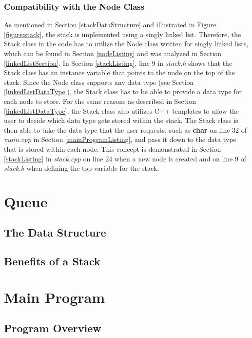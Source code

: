 \documentclass[letterpaper, 10pt,DIV=13]{scrartcl}
\numberwithin{equation}{section} %
\numberwithin{figure}{section} %
\numberwithin{table}{section} %
\begin{document}
\subsubsection{Compatibility with the Node Class}
As mentioned in Section \ref{stackDataStructure} and illustrated in Figure \ref{figure:stack}, the stack is implemented using a singly linked list. Therefore, the Stack
class in the code has to utilize the Node class written for singly linked lists, which can be found in Section \ref{nodeListing} and was analyzed in Section \ref{linkedListSection}.
In Section \ref{stackListing}, line 9 in \textit{stack.h} shows that the Stack class has an instance variable that points to the node on the top of the stack. Since the Node
class supports any data type (see Section \ref{linkedListDataType}), the Stack class has to be able to provide a data type for each node to store. For the same reasons as
described in Section \ref{linkedListDataType}, the Stack class also utilizes C++ templates to allow the user to decide which data type gets stored within the stack.
The Stack class is then able to take the data type that the user requests, such as \textbf{char} on line 32 of \textit{main.cpp} in Section \ref{mainProgramListing},
and pass it down to the data type that is stored within each node. This concept is demonstrated in Section \ref{stackListing} in \textit{stack.cpp} on 
line 24 when a new node is created and on line 9 of \textit{stack.h} when defining the top variable for the stack.

\section{Queue}
\subsection{The Data Structure}

\subsection{Benefits of a Stack}

\section{Main Program}
\subsection{Program Overview}
\end{document}
